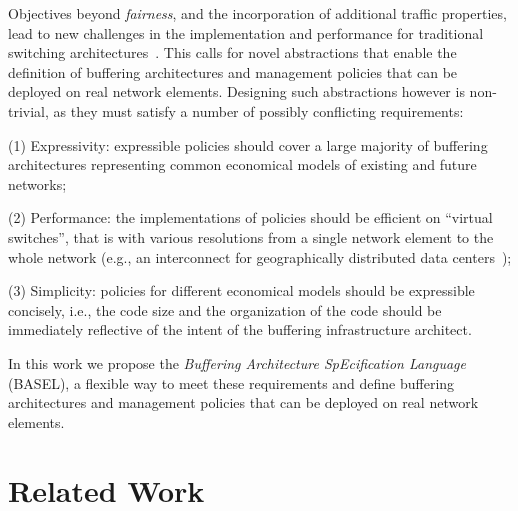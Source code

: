 \documentclass{article}
\newcommand{\barch}{BASEL}
\begin{document}
Objectives beyond \emph{fairness}, and the incorporation of additional traffic properties, lead to new challenges in the implementation and performance for traditional switching architectures~\cite{nofair,Gettys13,JainKMOPSVWZZZHSV13,HongKMZGNW13}. This calls for novel abstractions that enable the definition of buffering architectures and management policies that can be deployed on real network elements. Designing such abstractions however is non-trivial, as they must satisfy a number of possibly conflicting requirements: 
\begin{inparaenum}
\item[(1) {\sc Expressivity}:] expressible policies should cover a large majority of buffering architectures representing common economical models of existing and future networks; 
\item[(2) {\sc Performance}:] the implementations of policies should be efficient on ``virtual switches'', that is with various resolutions from a single network element to the whole network (e.g., an interconnect for geographically distributed data centers~\cite{JainKMOPSVWZZZHSV13,HongKMZGNW13}); 
\item[(3) {\sc Simplicity}:] policies for different economical models should be expressible concisely, i.e., the code size and the organization of the code should be immediately reflective of the intent of the buffering infrastructure architect.
\end{inparaenum}

In this work we propose the \emph{Buffering Architecture SpEcification Language} (\barch{}), a flexible way to
meet these requirements and define buffering architectures and management policies that can be deployed on real network elements.





\section{Related Work}\label{sec:related-work}
\end{document}
